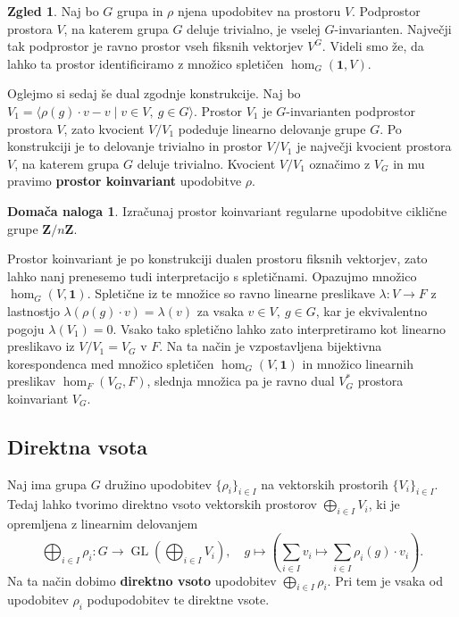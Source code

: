 \documentclass[11pt]{book}
\def\ZZ{\mathbf{Z}}
\def\oneone{\mathbf{1}}
\DeclareMathOperator\GL{GL}
\def\definicija{\color{rdeca}\bf}
\theoremstyle{definition}
\theoremstyle{zgled}
\newtheorem{zgled}[theorem]{Zgled}
\theoremstyle{zgledbrezstevilke}
\theoremstyle{odprtproblem}
\theoremstyle{domacanaloga}
\newtheorem{domacanaloga}[theorem]{Domača naloga}
\theoremstyle{izrek}
\begin{document}
\begin{zgled}
Naj bo $G$ grupa in $\rho$ njena upodobitev na prostoru $V$. Podprostor prostora $V$, na katerem grupa $G$ deluje trivialno, je vselej $G$-invarianten. Največji tak podprostor je ravno prostor vseh fiksnih vektorjev $V^G$. Videli smo že, da lahko ta prostor identificiramo z množico spletičen $\hom_G(\oneone, V)$.
    
Oglejmo si sedaj še dual zgodnje konstrukcije. Naj bo $V_1 = \langle \rho(g) \cdot v - v \mid v \in V, \ g \in G \rangle$. Prostor $V_1$ je $G$-invarianten podprostor prostora $V$, zato kvocient $V/V_1$ podeduje linearno delovanje grupe $G$. Po konstrukciji je to delovanje trivialno in prostor $V/V_1$ je največji kvocient prostora $V$, na katerem grupa $G$ deluje trivialno. Kvocient $V/V_1$ označimo z $V_G$ in mu pravimo {\definicija prostor koinvariant} upodobitve $\rho$.

\begin{domacanaloga}
    Izračunaj prostor koinvariant regularne upodobitve ciklične grupe $\ZZ/n\ZZ$.
\end{domacanaloga}

Prostor koinvariant je po konstrukciji dualen prostoru fiksnih vektorjev, zato lahko nanj prenesemo tudi interpretacijo s spletičnami. Opazujmo množico $\hom_G(V, \oneone)$. Spletične iz te množice so ravno linearne preslikave $\lambda \colon V \to F$ z lastnostjo $\lambda(\rho(g) \cdot v) = \lambda(v)$ za vsaka $v \in V, \ g \in G$, kar je ekvivalentno pogoju $\lambda(V_1) = 0$. Vsako tako spletično lahko zato interpretiramo kot linearno preslikavo iz $V/V_1 = V_G$ v $F$. Na ta način je vzpostavljena bijektivna korespondenca med množico spletičen $\hom_G(V,\oneone)$ in množico linearnih preslikav $\hom_F(V_G, F)$, slednja množica pa je ravno dual $V_G^*$ prostora koinvariant $V_G$.
\end{zgled}

\subsection{Direktna vsota}

Naj ima grupa $G$ družino upodobitev $\{ \rho_i \}_{i \in I}$ na vektorskih prostorih $\{ V_i \}_{i \in I}$. Tedaj lahko tvorimo direktno vsoto vektorskih prostorov $\bigoplus_{i \in I} V_i$, ki je opremljena z linearnim delovanjem
\[
  \bigoplus_{i \in I} \rho_i \colon G \to \GL(\bigoplus_{i \in I} V_i), \quad
  g \mapsto \left( \sum_{i \in I} v_i \mapsto \sum_{i \in I} \rho_i(g) \cdot v_i \right).
\]
Na ta način dobimo {\definicija direktno vsoto} upodobitev $\bigoplus_{i \in I} \rho_i$. Pri tem je vsaka od upodobitev $\rho_i$ podupodobitev te direktne vsote.
\end{document}
